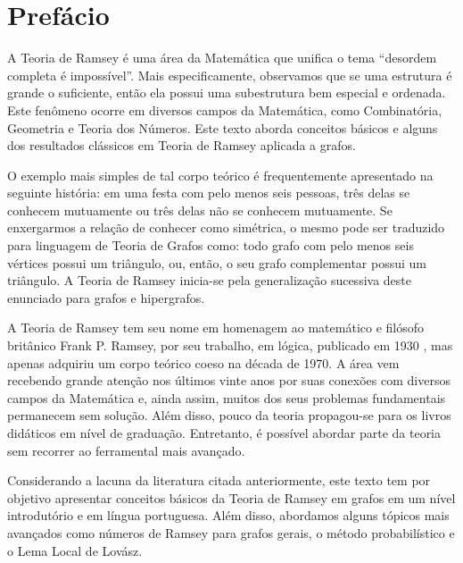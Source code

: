 
\chapter{Prefácio}

A Teoria de Ramsey é uma área da Matemática que unifica o tema ``desordem completa é impossível''. Mais especificamente, observamos que se uma estrutura é grande o suficiente, então ela possui uma subestrutura bem especial e ordenada. Este fenômeno ocorre em diversos campos da Matemática, como Combinatória, Geometria e Teoria dos Números. Este texto aborda conceitos básicos e alguns dos resultados clássicos em Teoria de Ramsey aplicada a grafos.

O exemplo mais simples de tal corpo teórico é frequentemente apresentado na seguinte história: em uma festa com pelo menos seis pessoas, três delas se conhecem mutuamente ou três delas não se conhecem mutuamente. Se enxergarmos a relação de conhecer como simétrica, o mesmo pode ser traduzido para linguagem de Teoria de Grafos como: todo grafo com pelo menos seis vértices possui um triângulo, ou, então, o seu grafo complementar possui um triângulo. A Teoria de Ramsey inicia-se pela generalização sucessiva deste enunciado para grafos e hipergrafos.

A Teoria de Ramsey tem seu nome em homenagem ao matemático e filósofo britânico Frank P. Ramsey, por seu trabalho, em lógica, publicado em 1930 \cite{ramsey}, mas apenas adquiriu um corpo teórico coeso na década de 1970. A área vem recebendo grande atenção nos últimos vinte anos por suas conexões com diversos campos da Matemática e, ainda assim, muitos dos seus problemas fundamentais permanecem sem solução. Além disso, pouco da teoria propagou-se para os livros didáticos em nível de graduação. Entretanto, é possível abordar parte da teoria sem recorrer ao ferramental mais avançado.

Considerando a lacuna da literatura citada anteriormente, este texto tem por objetivo apresentar conceitos básicos da Teoria de Ramsey em grafos em um nível introdutório e em língua portuguesa. Além disso, abordamos alguns tópicos mais avançados como números de Ramsey para grafos gerais, o método probabilístico e o Lema Local de Lovász.


